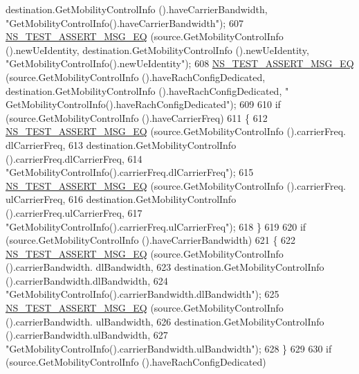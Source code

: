 \begin{DoxyCode}
      destination.GetMobilityControlInfo ().haveCarrierBandwidth, \textcolor{stringliteral}{"GetMobilityControlInfo().haveCarrierBandwidth"});
607       \hyperlink{group__testing_ga2a9d78cffb3db8e867c35fff0b698cf5}{NS\_TEST\_ASSERT\_MSG\_EQ} (source.GetMobilityControlInfo ().newUeIdentity,
      destination.GetMobilityControlInfo ().newUeIdentity, \textcolor{stringliteral}{"GetMobilityControlInfo().newUeIdentity"});
608       \hyperlink{group__testing_ga2a9d78cffb3db8e867c35fff0b698cf5}{NS\_TEST\_ASSERT\_MSG\_EQ} (source.GetMobilityControlInfo ().haveRachConfigDedicated,
      destination.GetMobilityControlInfo ().haveRachConfigDedicated, \textcolor{stringliteral}{"
      GetMobilityControlInfo().haveRachConfigDedicated"});
609 
610       \textcolor{keywordflow}{if} (source.GetMobilityControlInfo ().haveCarrierFreq)
611         \{
612           \hyperlink{group__testing_ga2a9d78cffb3db8e867c35fff0b698cf5}{NS\_TEST\_ASSERT\_MSG\_EQ} (source.GetMobilityControlInfo ().carrierFreq.
      dlCarrierFreq,
613                                  destination.GetMobilityControlInfo ().carrierFreq.dlCarrierFreq,
614                                  \textcolor{stringliteral}{"GetMobilityControlInfo().carrierFreq.dlCarrierFreq"});
615           \hyperlink{group__testing_ga2a9d78cffb3db8e867c35fff0b698cf5}{NS\_TEST\_ASSERT\_MSG\_EQ} (source.GetMobilityControlInfo ().carrierFreq.
      ulCarrierFreq,
616                                  destination.GetMobilityControlInfo ().carrierFreq.ulCarrierFreq,
617                                  \textcolor{stringliteral}{"GetMobilityControlInfo().carrierFreq.ulCarrierFreq"});
618         \}
619 
620       \textcolor{keywordflow}{if} (source.GetMobilityControlInfo ().haveCarrierBandwidth)
621         \{
622           \hyperlink{group__testing_ga2a9d78cffb3db8e867c35fff0b698cf5}{NS\_TEST\_ASSERT\_MSG\_EQ} (source.GetMobilityControlInfo ().carrierBandwidth.
      dlBandwidth,
623                                  destination.GetMobilityControlInfo ().carrierBandwidth.dlBandwidth,
624                                  \textcolor{stringliteral}{"GetMobilityControlInfo().carrierBandwidth.dlBandwidth"});
625           \hyperlink{group__testing_ga2a9d78cffb3db8e867c35fff0b698cf5}{NS\_TEST\_ASSERT\_MSG\_EQ} (source.GetMobilityControlInfo ().carrierBandwidth.
      ulBandwidth,
626                                  destination.GetMobilityControlInfo ().carrierBandwidth.ulBandwidth,
627                                  \textcolor{stringliteral}{"GetMobilityControlInfo().carrierBandwidth.ulBandwidth"});
628         \}
629 
630       \textcolor{keywordflow}{if} (source.GetMobilityControlInfo ().haveRachConfigDedicated)

\end{DoxyCode}
